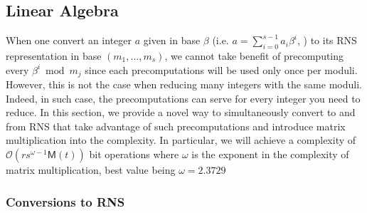 \documentclass[acmtoms,acmnow]{acmtrans2m}
\def\M{\mathsf{M}} \def\I{\mathsf{I}} \def\R{\mathsf{R}} \def\Q{\mathbb{Q}}
\def\bigO{{\ensuremath{\mathcal{O}}}}
\begin{document}
\subsection{Linear Algebra}
When one convert an integer $a$ given in base $\beta$ (i.e. $a=\sum_{i=0}^{s-1} a_i\beta^i$, ) to its RNS representation in base $(m_1,\dots,m_s)$, we cannot take benefit of precomputing every
$\beta^i \bmod m_j$ since each precomputations will be used only once per moduli. However, this is not the case when reducing many integers with the same moduli. Indeed, in such case,  the
precomputations can serve for every integer you need to reduce. In this section, we provide a novel way to simultaneously convert to and from RNS that take advantage of such precomputations and
introduce matrix multiplication into the complexity. In particular, we will achieve a complexity of $\bigO(rs^{\omega-1}\M(t))$ bit operations where $\omega$ is the exponent in the complexity of
matrix multiplication, best value being $\omega=2.3729$ \cite{LeGall:2014}


\subsubsection{Conversions to RNS}
\end{document}
